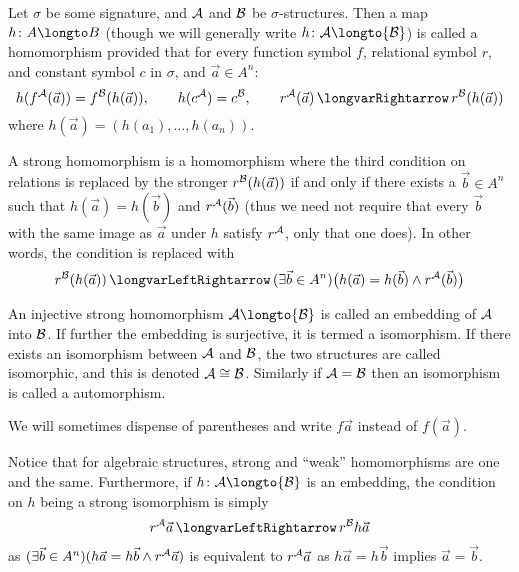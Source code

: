 \bdefn

    Let $\sigma$ be some signature, and ${\cal A}$ and ${\cal B}$ be $\sigma$-structures.
    Then a map $h\colon A\longto B$ (though we will generally write $h\colon{\cal A}\longto{\cal B}$) is called a {\emphcolor homomorphism} provided that for every function
    symbol $f$, relational symbol $r$, and constant symbol $c$ in $\sigma$, and $\vec a\in A^n$:
    $$ h(f^{\cal A}(\vec a))=f^{\cal B}(h(\vec a)),\qquad h(c^{\cal A})=c^{\cal B},\qquad r^{\cal A}(\vec a)\implies r^{\cal B}(h(\vec a)) $$
    where $h(\vec a)=(h(a_1),\dots,h(a_n))$.

    A {\emphcolor strong homomorphism} is a homomorphism where the third condition on relations is replaced by the stronger $r^{\cal B}(h(\vec a))$ if and only if there exists a $\vec b\in A^n$ such that
    $h(\vec a)=h(\vec b)$ and $r^{\cal A}(\vec b)$ (thus we need not require that every $\vec b$ with the same image as $\vec a$ under $h$ satisfy $r^{\cal A}$, only that one does).
    In other words, the condition is replaced with
    $$ r^{\cal B}(h(\vec a)) \iff (\exists\vec b\in A^n)\bigl(h(\vec a)=h(\vec b)\land r^{\cal A}(\vec b)\bigr) $$

    An injective strong homomorphism ${\cal A}\longto{\cal B}$ is called an {\emphcolor embedding} of ${\cal A}$ into ${\cal B}$.
    If further the embedding is surjective, it is termed a {\emphcolor isomorphism}.
    If there exists an isomorphism between ${\cal A}$ and ${\cal B}$, the two structures are called {\emphcolor isomorphic}, and this is denoted ${\cal A}\cong{\cal B}$.
    Similarly if ${\cal A}={\cal B}$ then an isomorphism is called a {\emphcolor automorphism}.

\edefn
    
We will sometimes dispense of parentheses and write $f\vec a$ instead of $f(\vec a)$.

Notice that for algebraic structures, strong and ``weak'' homomorphisms are one and the same.
Furthermore, if $h\colon{\cal A}\longto{\cal B}$ is an embedding, the condition on $h$ being a strong isomorphism is simply
$$ r^{\cal A}\vec a \iff r^{\cal B}h\vec a $$
as $(\exists\vec b\in A^n)(h\vec a=h\vec b\land r^{\cal A}\vec a)$ is equivalent to $r^{\cal A}\vec a$ as $h\vec a=h\vec b$ implies $\vec a=\vec b$.

